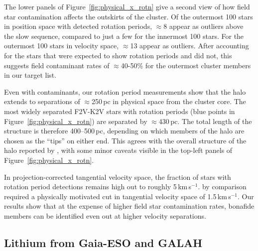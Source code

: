 \documentclass[12pt,twocolumn,tighten]{aastex63}
\newcommand{\kms}{\,km\,s$^{-1}$}
\begin{document}
The lower panels of Figure~\ref{fig:physical_x_rotn} give a second
view of how field star contamination affects the outskirts of the
cluster.  Of the outermost 100 stars in position space with detected
rotation periods, $\approx$8 appear as outliers above the slow
sequence, compared to just a few for the innermost 100 stars.  For the
outermost 100 stars in velocity space, $\approx$13 appear as outliers.
After accounting for the stars that were expected to show rotation
periods and did not, this suggests field contaminant rates of
$\approx$40-50\% for the outermost cluster members in our target list.

Even with contaminants, our rotation period measurements show that the
halo extends to separations of $\approx$250\,pc in physical space from
the cluster core.  The most widely separated F2V-K2V stars with
rotation periods (blue points in Figure~\ref{fig:physical_x_rotn}) are
separated by $\approx$430\,pc.  The total length of the structure is
therefore 400--500\,pc, depending on which members of the halo are
chosen as the ``tips'' on either end.  This agrees with the overall
structure of the halo reported by
, with some minor caveats visible
in the top-left panels of Figure~\ref{fig:physical_x_rotn}.

In projection-corrected tangential velocity space, the fraction of
stars with rotation period detections remains high out to roughly
5\kms.  \citet{meingast_2021} by comparison required a physically
motivated cut in tangential velocity space of 1.5\kms.  Our results
show that at the expense of higher field star contamination rates,
bonafide members can be identified even out at higher velocity
separations.


\subsection{Lithium from Gaia-ESO and GALAH}
\label{subsec:lithium}
\end{document}
